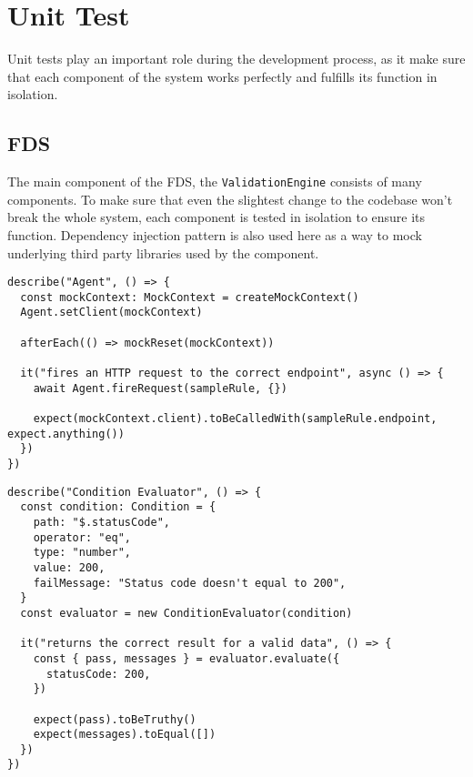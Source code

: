 \section{Unit Test}

  Unit tests play an important role during the development process, as it make sure that each component of the system works perfectly and fulfills its function in isolation.

  \subsection{FDS}

    The main component of the FDS, the \verb;ValidationEngine; consists of many components. To make sure that even the slightest change to the codebase won't break the whole system, each component is tested in isolation to ensure its function. Dependency injection pattern is also used here as a way to mock underlying third party libraries used by the component. 

    \begin{lstlisting}[style=es6, caption={Dependency injection usage in a unit test within FDS project (TypeScript)}]
describe("Agent", () => {
  const mockContext: MockContext = createMockContext()
  Agent.setClient(mockContext)

  afterEach(() => mockReset(mockContext))

  it("fires an HTTP request to the correct endpoint", async () => {
    await Agent.fireRequest(sampleRule, {})

    expect(mockContext.client).toBeCalledWith(sampleRule.endpoint, expect.anything())
  })
})
\end{lstlisting}

    \newpage
    \begin{lstlisting}[style=es6, caption={Example unit test of the condition evaluator (TypeScript)}]
describe("Condition Evaluator", () => {
  const condition: Condition = {
    path: "$.statusCode",
    operator: "eq",
    type: "number",
    value: 200,
    failMessage: "Status code doesn't equal to 200",
  }
  const evaluator = new ConditionEvaluator(condition)

  it("returns the correct result for a valid data", () => {
    const { pass, messages } = evaluator.evaluate({
      statusCode: 200,
    })

    expect(pass).toBeTruthy()
    expect(messages).toEqual([])
  })
})
\end{lstlisting}

